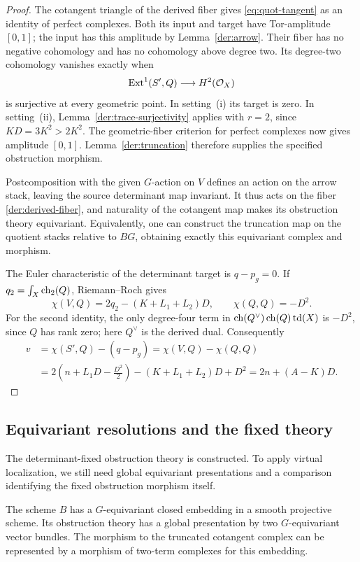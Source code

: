 \begin{proof}
The cotangent triangle of the derived fiber gives
\eqref{eq:quot-tangent} as an identity of perfect complexes.
Both its input and target have Tor-amplitude $[0,1]$; the input has
this amplitude by Lemma~\ref{der:arrow}.  Their fiber has no negative
cohomology and has no cohomology above degree two.  Its degree-two
cohomology vanishes exactly when
\[
\operatorname{Ext}^1(S',Q)\longrightarrow H^2(\mathcal O_X)
\]
is surjective at every geometric point.  In setting~(i) its target is
zero.  In setting~(ii), Lemma~\ref{der:trace-surjectivity} applies with
$r=2$, since $KD=3K^2>2K^2$.  The geometric-fiber criterion for perfect
complexes now gives amplitude $[0,1]$.  Lemma~\ref{der:truncation}
therefore supplies the specified obstruction morphism.

Postcomposition with the given $G$-action on $V$ defines an action on
the arrow stack, leaving the source determinant map invariant.  It
thus acts on the fiber \eqref{der:derived-fiber}, and naturality of the
cotangent map makes its obstruction theory equivariant.  Equivalently,
one can construct the truncation map on the quotient stacks relative
to $BG$, obtaining exactly this equivariant complex and morphism.

The Euler characteristic of the determinant target is $q-p_g=0$.
If $q_2=\int_X\operatorname{ch}_2(Q)$, Riemann--Roch gives
\[
\chi(V,Q)=2q_2-(K+L_1+L_2)D,\qquad
\chi(Q,Q)=-D^2.
\]
For the second identity, the only degree-four term in
$\operatorname{ch}(Q^\vee)\operatorname{ch}(Q)\operatorname{td}(X)$ is $-D^2$, since $Q$ has rank zero;
here $Q^\vee$ is the derived dual.
Consequently
\begin{align*}
v&=\chi(S',Q)-(q-p_g)
  =\chi(V,Q)-\chi(Q,Q)\\
 &=2\left(n+L_1D-\frac{D^2}{2}\right)
   -(K+L_1+L_2)D+D^2
  =2n+(A-K)D.
\end{align*}
\end{proof}

\subsection{Equivariant resolutions and the fixed theory}

The determinant-fixed obstruction theory is constructed. To apply
virtual localization, we still need global equivariant presentations
and a comparison identifying the fixed obstruction morphism itself.

\begin{lemma}\label{der:global-resolution}
The scheme $B$ has a $G$-equivariant closed embedding in a smooth
projective scheme.  Its obstruction theory has a global presentation
by two $G$-equivariant vector bundles.  The morphism to the truncated
cotangent complex can be represented by a morphism of two-term
complexes for this embedding.
\end{lemma}

